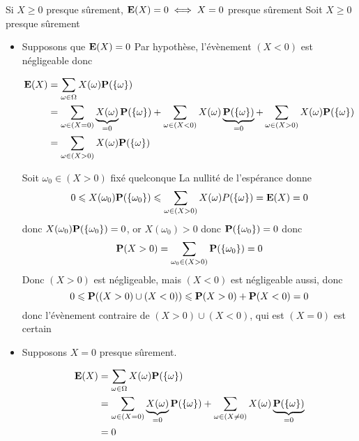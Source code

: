\documentclass{article}
\renewenvironment{question_kholle}[2][ ]
{
	\subsection{\texorpdfstring{#2}{}}
	\notblank{#1}
	{
		\noindent #1
		\bigbreak
	}
	{}
	\begin{proof}
}
{
	\end{proof}
}
\begin{document}
\begin{question_kholle}{Si $X \geqslant 0$ presque sûrement, $\mathbf E(X) = 0 \iff X = 0$ presque sûrement}
	Soit $X\geqslant 0$ presque sûrement
	\begin{itemize}
		\item Supposons que $\mathbf E(X) = 0$
		Par hypothèse, l'évènement $(X<0)$ est négligeable donc
		
		\begin{align*}
			\mathbf E (X) & = \sum_{\omega \in \Omega}X(\omega)\mathbf P(\{ \omega \}) \\
			&= \sum_{\omega \in (X = 0)} \underbrace{ X(\omega) }_{ = 0 } \mathbf P(\{ \omega  \}) + \sum_{\omega \in (X<0)}X(\omega) \underbrace{ \mathbf P(\{ \omega \}) }_{ =0 } + \sum_{\omega \in (X >0)} X(\omega)\mathbf P(\{ \omega \}) \\
			&= \sum_{\omega \in (X >0)} X(\omega)\mathbf P(\{ \omega \})
		\end{align*}
		
		Soit $\omega_{0} \in (X>0)$ fixé quelconque
		La nullité de l'espérance donne
		$$0 \leqslant X(\omega_{0})\mathbf P(\{ \omega_{0} \}) \leqslant \sum_{\omega \in(X>0)}X(\omega) P(\{ \omega \})= \mathbf E(X) = 0$$
		donc $X(\omega_{0})\mathbf P(\{ \omega_{0} \}) = 0$, or $X(\omega_{0})>0$ donc $\mathbf P(\{ \omega_{0} \})=0$
		donc 
		$$\mathbf P(X>0) = \sum_{\omega_{0} \in (X>0)} \mathbf P(\{ \omega_{0} \}) = 0$$
		Donc  $(X>0)$ est négligeable, mais $(X<0)$ est négligeable aussi, donc
		$$0\leqslant \mathbf P((X>0) \cup (X<0))\leqslant \mathbf P(X>0) + \mathbf P(X<0)=0$$
		donc l'évènement contraire de $(X>0) \cup (X<0)$, qui est $(X=0)$ est certain
		
		\item Supposons $X=0$ presque sûrement.
		
		\begin{align*}
			\mathbf E(X) &= \sum_{\omega \in \Omega}X(\omega)\mathbf P(\{ \omega \}) \\
			&= \sum_{\omega \in (X = 0)} \underbrace{ X(\omega) }_{ =0 } \mathbf P(\{ \omega \}) + \sum_{\omega \in (X \neq 0)} X(\omega) \underbrace{ \mathbf P(\{ \omega \}) }_{ =0 } \\
			&= 0
		\end{align*}
		
	\end{itemize}
\end{question_kholle}
\end{document}
